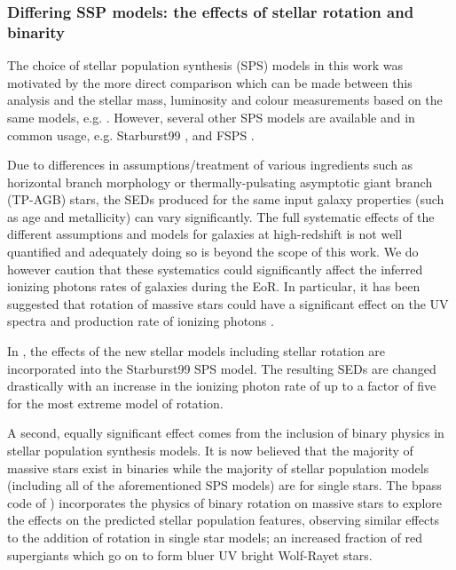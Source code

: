 \subsubsection{Differing SSP models: the effects of stellar rotation and binarity}
The choice of \citet{Bruzual:2003ckb} stellar population synthesis (SPS) models in this work was motivated by the more direct comparison which can be made between this analysis and the stellar mass, luminosity and colour measurements based on the same models, e.g. \citet{2012ApJ...756..164F,Duncan:2014gh}. However, several other SPS models are available and in common usage, e.g. Starburst99 \citep{Leitherer:1999jt}, \citet{Maraston:2005er} and FSPS \citep{Conroy:2009ks,Conroy:2009ja}.

Due to differences in assumptions/treatment of various ingredients such as horizontal branch morphology or thermally-pulsating asymptotic giant branch (TP-AGB) stars, the SEDs produced for the same input galaxy properties (such as age and metallicity) can vary significantly. The full systematic effects of the different assumptions and models for galaxies at high-redshift is not well quantified and adequately doing so is beyond the scope of this work. We do however caution that these systematics could significantly affect the inferred ionizing photons rates of galaxies during the EoR. In particular, it has been suggested that rotation of massive stars could have a significant effect on the UV spectra and production rate of ionizing photons \citep{Vazquez:2007jt}.

In \citet{Leitherer:2014ia}, the effects of the new stellar models including stellar rotation \citep{Ekstrom:2012ke} are incorporated into the Starburst99 SPS model. The resulting SEDs are changed drastically with an increase in the ionizing photon rate of up to a factor of five for the most extreme model of rotation.

A second, equally significant effect comes from the inclusion of binary physics in stellar population synthesis models. It is now believed that the majority of massive stars exist in binaries \citep{Sana:2012gu,Sana:2013hh,Aldoretta:2014un} while the majority of stellar population models (including all of the aforementioned SPS models) are for single stars. The {\sc bpass} code of \citet{Eldridge:2009bi,Eldridge:2011kg}) incorporates the physics of binary rotation on massive stars to explore the effects on the predicted stellar population features, observing similar effects to the addition of rotation in single star models; an increased fraction of red supergiants which go on to form bluer UV bright Wolf-Rayet stars.

